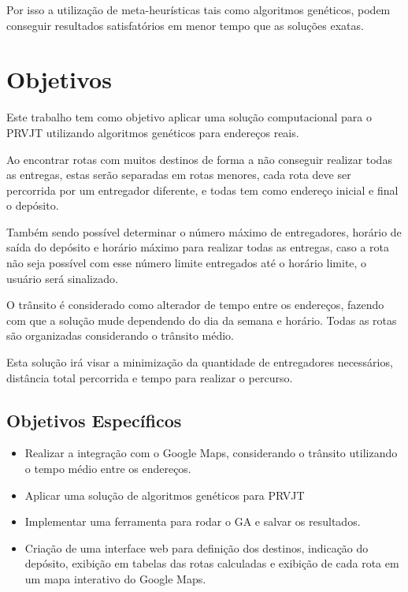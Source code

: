 Por isso a utilização de meta-heurísticas tais como algoritmos genéticos, podem conseguir resultados satisfatórios em menor tempo que as soluções exatas. \cite{BraysyAG}

\section{Objetivos}

Este trabalho tem como objetivo aplicar uma solução computacional para o PRVJT utilizando algoritmos genéticos para endereços reais.

Ao encontrar rotas com muitos destinos de forma a não conseguir realizar todas as entregas, estas serão separadas em rotas menores, cada rota deve ser percorrida por um entregador diferente, e todas tem como endereço inicial e final o depósito.

Também sendo possível determinar o número máximo de entregadores, horário de saída do depósito e horário máximo para realizar todas as entregas, caso a rota não seja possível com esse número limite entregados até o horário limite, o usuário será sinalizado.

O trânsito é considerado como alterador de tempo entre os endereços, fazendo com que a solução mude dependendo do dia da semana e horário. Todas as rotas são organizadas considerando o trânsito médio.

Esta solução irá visar a minimização da quantidade de entregadores necessários, distância total percorrida e tempo para realizar o percurso.

\subsection{Objetivos Específicos}

\begin{itemize}
	\item Realizar a integração com o Google Maps, considerando o trânsito utilizando o tempo médio entre os endereços.
	\item Aplicar uma solução de algoritmos genéticos para PRVJT 
	\item Implementar uma ferramenta para rodar o GA e salvar os resultados.
	\item Criação de uma interface web para definição dos destinos, indicação do depósito, exibição em tabelas das rotas calculadas e exibição de cada rota em um mapa interativo do Google Maps.
\end{itemize}


